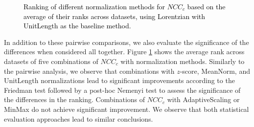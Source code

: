 \documentclass[11pt]{article}
\begin{document}
\begin{figure} \centering {}
\vspace{-0.3cm}
\caption{\textcolor{black}{Ranking of different normalization methods for $NCC_{c}$ based on the average of their ranks across datasets, using Lorentzian with UnitLength as the baseline method.}}
\label{john_fig:sliding1}
\vspace{-0.2cm}
\end{figure}







In addition to these pairwise comparisons, we also evaluate the significance of the differences when considered all together. Figure \ref{john_fig:sliding1} shows the average rank across datasets of five combinations of $NCC_{c}$ with normalization methods. Similarly to the pairwise analysis, we observe that combinations with $z$-score, MeanNorm, and UnitLength normalizations lead to significant improvements according to the Friedman test followed by a post-hoc Nemenyi test to assess the significance of the differences in the ranking. Combinations of $NCC_{c}$ with AdaptiveScaling or MinMax do not achieve significant improvement. We observe that both statistical evaluation approaches lead to similar conclusions.
\end{document}

